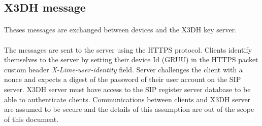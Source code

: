 \documentclass[a4paper,11pt]{article}
\begin{document}
  \subsection{X3DH message}
    \paragraph{}Theses messages are exchanged between devices and the X3DH key server.
    \paragraph*{}The messages are sent to the server using the HTTPS protocol. Clients identify themselves to the server by setting their device Id (GRUU) in the HTTPS packet custom header \textit{X-Lime-user-identity} field. Server challenges the client with a nonce and expects a digest of the password of their user account on the SIP server. X3DH server must have access to the SIP register server database to be able to authenticate clients. Communications between clients and X3DH server are assumed to be secure and the details of this assumption are out of the scope of this document.
\end{document}
